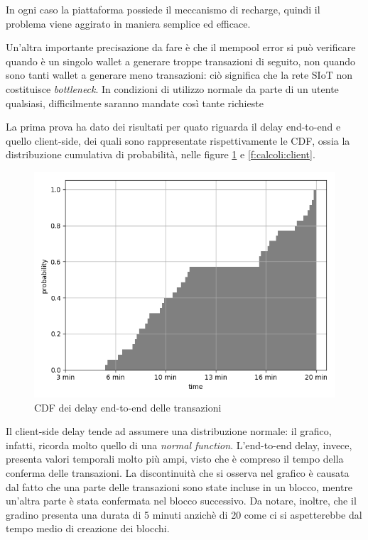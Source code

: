 In ogni caso la piattaforma possiede il meccanismo di recharge, quindi il problema viene aggirato in maniera semplice ed efficace.

Un'altra importante precisazione da fare è che il mempool error si può verificare quando è un singolo wallet a generare troppe transazioni di seguito, non quando sono tanti wallet a generare meno transazioni: ciò significa che la rete SIoT non costituisce \textit{bottleneck}. In condizioni di utilizzo normale da parte di un utente qualsiasi, difficilmente saranno mandate così tante richieste

La prima prova ha dato dei risultati per quato riguarda il delay end-to-end e quello client-side, dei quali sono rappresentate rispettivamente le CDF, ossia la distribuzione cumulativa di probabilità, nelle figure \ref{f:calcoli:end2end} e \ref{f:calcoli:client}. 

\begin{figure}[h!t]
\centerline{\includegraphics[width=\textwidth]{img/end-to-endGIUSTO}}
\caption{CDF dei delay end-to-end delle transazioni}
\label{f:calcoli:end2end}
\end{figure}

Il client-side delay tende ad assumere una distribuzione normale: il grafico, infatti, ricorda molto quello di una \textit{normal function}. 
L'end-to-end delay, invece, presenta valori temporali molto più ampi, visto che è compreso il tempo della conferma delle transazioni. La discontinuità che si osserva nel grafico è causata dal fatto che una parte delle transazioni sono state incluse in un blocco, mentre un'altra parte è stata confermata nel blocco successivo. Da notare, inoltre, che il gradino presenta una durata di 5 minuti anzichè di 20 come ci si aspetterebbe dal tempo medio di creazione dei blocchi.



